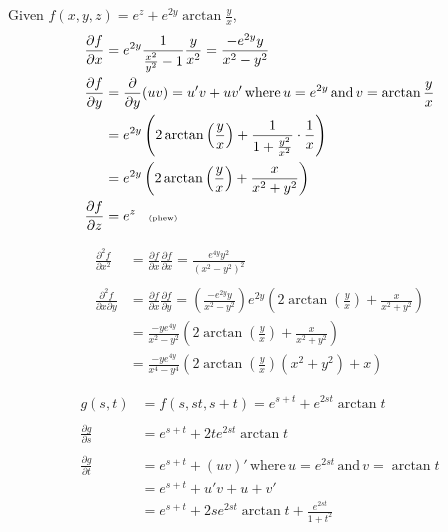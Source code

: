 \documentclass[a4paper,norsk,12pt]{article}
\begin{document}
Given $f(x,y,z) = e^z + e^{2y}\arctan{\frac{y}{x}}$,
\begin{align*}
  \frac{\partial f}{\partial x} &=
    e^{2y}\frac{1}{\frac{x^2}{y^2}-1}\frac{y}{x^2} 
      = \frac{-e^{2y}y}{x^2-y^2} \\
    \frac{\partial f}{\partial y} &= \frac{\partial}{\partial y}(uv) =
    u'v+uv' \,\text{where}\, u=e^{2y} \,\text{and}\, v=\arctan{\frac{y}{x}} \\
    &= e^{2y}\left( 2\arctan{\left(\frac{y}{x}\right)} + \frac{1}{1+\frac{y^2}{x^2}}\cdot\frac{1}{x}\right) \\
    &= e^{2y}\left( 2\arctan{\left(\frac{y}{x}\right)} + \frac{x}{x^2+y^2} \right) \\
    \frac{\partial f}{\partial z} &= e^z \>\>\>\>\text{\tiny{(phew)}}
\end{align*}

\begin{align*}
  \frac{\partial^2 f}{\partial x^2} &= \frac{\partial f}{\partial x} \frac{\partial f}{\partial x} 
    = \frac{e^{4y}y^2}{(x^2-y^2)^2} \\
  \\
  \frac{\partial^2 f}{\partial x \partial y} &=
    \frac{\partial f}{\partial x} \frac{\partial f}{\partial y} =
    \left(\frac{-e^{2y}y}{x^2-y^2}\right) e^{2y}\left( 2\arctan{\left(\frac{y}{x}\right)} + \frac{x}{x^2+y^2} \right) \\
  &= \frac{-ye^{4y}}{x^2-y^2}
          \left(
            2\arctan{\left(\frac{y}{x}\right)} + \frac{x}{x^2+y^2}
          \right) \\
  &= \frac{-ye^{4y}}{x^4-y^4}
          \left(
            2\arctan{\left(\frac{y}{x}\right)}(x^2+y^2) + x
          \right)
\end{align*}

\begin{align*}
  g(s,t) &= f(s, st, s+t) = e^{s+t} + e^{2st}\arctan{t} \\
  \\
  \frac{\partial g}{\partial s} &= e^{s+t} + 2te^{2st}\arctan{t} \\
  \\
  \frac{\partial g}{\partial t} &= e^{s+t} + (uv)' \,\text{where}\, u=e^{2st}
    \,\text{and}\, v=\arctan{t} \\
    &= e^{s+t} + u'v + u+v' \\
    &= e^{s+t} + 2se^{2st}\arctan{t} + \frac{e^{2st}}{1+t^2}
\end{align*}
\end{document}
